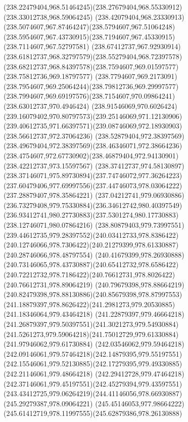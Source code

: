 {    \curveto(238.22479404,968.51464245)(238.27679404,968.55330912)(238.33012738,968.59064245)
    \curveto(238.42079404,968.23330913)(238.5074607,967.87464247)(238.5794607,967.51064248)
    \curveto(238.5954607,967.43730915)(238.7194607,967.45330915)(238.7114607,967.52797581)
    \curveto(238.67412737,967.92930914)(238.61812737,968.32797579)(238.55279404,968.72397578)
    \curveto(238.68212737,968.84397578)(238.7594607,969.01597577)(238.75812736,969.18797577)
    \curveto(238.7794607,969.2173091)(238.7954607,969.25064244)(238.79812736,969.29997577)
    \curveto(238.7994607,969.69197576)(238.7154607,970.09864241)(238.63012737,970.4946424)
    \curveto(238.91546069,970.6026424)(239.16079402,970.80797573)(239.25146069,971.12130906)
    \curveto(239.40612735,971.66397571)(239.08746069,972.18930903)(238.56612737,972.37064236)
    \curveto(238.52879404,972.38397569)(238.49679404,972.38397569)(238.46346071,972.38664236)
    \curveto(238.4754607,972.67730902)(238.46879404,972.94130901)(238.42212737,973.15597567)
    \curveto(238.37412737,974.58130897)(238.37146071,975.89730894)(237.74746072,977.36264223)
    \curveto(237.60479406,977.69997556)(237.44746073,978.03064222)(237.28879407,978.35864221)
    \curveto(237.04212741,979.06930886)(236.73279408,979.75330884)(236.34612742,980.40397549)
    \curveto(236.93412741,980.27730883)(237.5301274,980.17730883)(238.12746071,980.07864216)
    \curveto(238.80879403,979.73997551)(239.44612735,979.28397552)(240.03412733,978.8386422)
    \curveto(240.12746066,978.7306422)(240.21279399,978.61330887)(240.28746066,978.48797554)
    \curveto(240.41679399,978.26930888)(240.73146065,978.43730887)(240.65412732,978.6586422)
    \curveto(240.72212732,978.7186422)(240.76612731,978.8026422)(240.76612731,978.89064219)
    \curveto(240.79679398,978.88664219)(240.82479398,978.88130886)(240.85679398,978.87997553)
    \curveto(241.18879397,978.8626422)(241.2981273,979.20530885)(241.18346064,979.43464218)
    \curveto(241.22879397,979.46664218)(241.26879397,979.50397551)(241.3021273,979.54930884)
    \curveto(241.5261273,979.59064218)(241.75012729,979.61330884)(241.97946062,979.61730884)
    \curveto(242.03546062,979.59464218)(242.09146061,979.57464218)(242.14879395,979.55197551)
    \curveto(242.15546061,979.52130885)(242.17279395,979.49330885)(242.21146061,979.48664218)
    \curveto(242.29412728,979.47464218)(242.37146061,979.45197551)(242.45279394,979.43597551)
    \curveto(243.43412725,979.06264219)(244.41146056,978.66930887)(245.29279387,978.09064221)
    \curveto(245.45146053,977.98664222)(245.61412719,978.11997555)(245.62879386,978.26130888)
}
